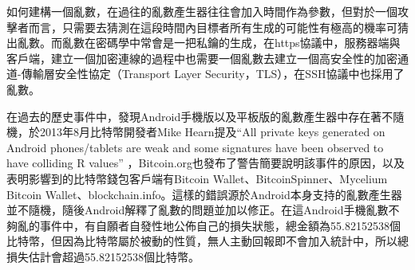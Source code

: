 				如何建構一個亂數，在過往的亂數產生器往往會加入時間作為參數，但對於一個攻擊者而言，只需要去猜測在這段時間內目標者所有生成的可能性有極高的機率可猜出亂數。而亂數在密碼學中常會是一把私鑰的生成，在https協議中，服務器端與客戶端，建立一個加密連線的過程中也需要一個亂數去建立一個高安全性的加密通道-傳輸層安全性協定（Transport Layer Security，TLS）\supercite{dierks2008transport}，在SSH協議中也採用了亂數。
		
				在過去的歷史事件中，發現Android手機版以及平板版的亂數產生器中存在著不隨機，於2013年8月比特幣開發者Mike Hearn提及“All private keys generated on Android phones/tablets are weak and some signatures have been observed to have colliding R values” \supercite{SomeSecureRandomThoughts}，Bitcoin.org也發布了警告\supercite{AndroidSecurityVulnerability}簡要說明該事件的原因，以及表明影響到的比特幣錢包客戶端有Bitcoin Wallet、BitcoinSpinner、Mycelium Bitcoin Wallet、blockchain.info。這樣的錯誤源於Android本身支持的亂數產生器並不隨機，隨後Android解釋了亂數的問題並加以修正。在這Android手機亂數不夠亂的事件中，有自願者自發性地公佈自己的損失狀態，總金額為55.82152538個比特幣\supercite{Badsignaturesleading}，但因為比特幣屬於被動的性質，無人主動回報即不會加入統計中，所以總損失估計會超過55.82152538個比特幣。


